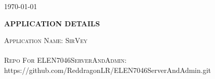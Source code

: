 \documentclass[12pt]{witseiepaper}
\begin{document}
\begin{titlepage}
\begin{center}
    {\large \today}\\[2cm]
    
  \end{center}
  \large


  \textbf{}
\end{titlepage}





 \thispagestyle{empty}\pagestyle{empty}
 \begin{center}
  \textsc{\bfseries APPLICATION DETAILS} \\ [1.0cm]
 \end{center}


  \textsc{Application Name: SirVey} \\
   \\
   \textsc{Repo For ELEN7046ServerAndAdmin:} \\https://github.com/ReddragonLR/ELEN7046ServerAndAdmin.git \\
\end{document}
